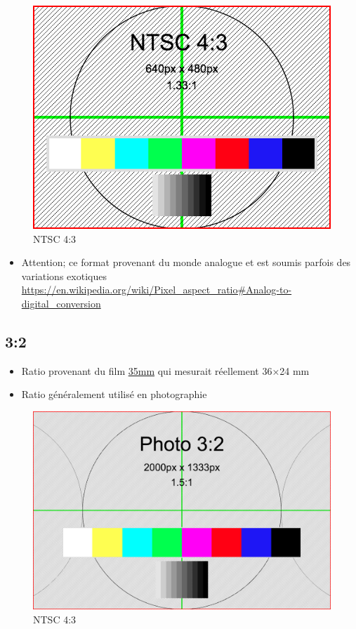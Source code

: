 \documentclass[
  french,
]{book}
\providecommand{\tightlist}{%
  \setlength{\itemsep}{0pt}\setlength{\parskip}{0pt}}
\begin{document}
\begin{figure}
\centering
\includegraphics{medias/lexique/NTSC_4_3_640x480.png}
\caption{NTSC 4:3}
\end{figure}

\begin{itemize}
\tightlist
\item
  Attention; ce format provenant du monde analogue et est soumis parfois des variations exotiques
  \url{https://en.wikipedia.org/wiki/Pixel_aspect_ratio\#Analog-to-digital_conversion}
\end{itemize}

\hypertarget{section-3}{%
\subsection{3:2}\label{section-3}}

\begin{itemize}
\item
  Ratio provenant du film \href{https://en.wikipedia.org/wiki/35_mm_format}{35mm} qui mesurait réellement 36×24 mm
\item
  Ratio généralement utilisé en photographie
\end{itemize}

\begin{figure}
\centering
\includegraphics{medias/lexique/Photo_3_2_2000x1333.png}
\caption{NTSC 4:3}
\end{figure}
\end{document}
